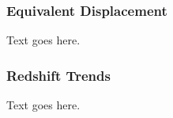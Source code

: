 \subsubsection{Equivalent Displacement}
\label{subsubsec:analysis--alt_diff_dist--equiv_displacment}


Text goes here.



\subsubsection{Redshift Trends}
\label{subsubsec:analysis--alt_diff_dist--trends}


Text goes here.




